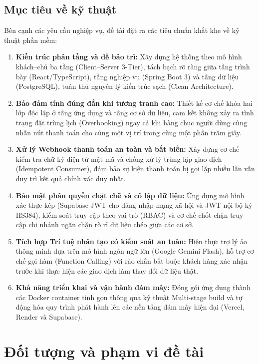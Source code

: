 \subsection{Mục tiêu về kỹ thuật}
Bên cạnh các yêu cầu nghiệp vụ, đề tài đặt ra các tiêu chuẩn khắt khe về kỹ thuật phần mềm:
\begin{enumerate}
    \item \textbf{Kiến trúc phân tầng và dễ bảo trì:} Xây dựng hệ thống theo mô hình khách--chủ ba tầng (Client--Server 3-Tier), tách bạch rõ ràng giữa tầng trình bày (React/TypeScript), tầng nghiệp vụ (Spring Boot 3) và tầng dữ liệu (PostgreSQL), tuân thủ nguyên lý kiến trúc sạch (Clean Architecture).
    \item \textbf{Bảo đảm tính đúng đắn khi tương tranh cao:} Thiết kế cơ chế khóa hai lớp độc lập ở tầng ứng dụng và tầng cơ sở dữ liệu, cam kết không xảy ra tình trạng đặt trùng lịch (Overbooking) ngay cả khi hàng chục người dùng cùng nhấn nút thanh toán cho cùng một vị trí trong cùng một phần trăm giây.
    \item \textbf{Xử lý Webhook thanh toán an toàn và bất biến:} Xây dựng cơ chế kiểm tra chữ ký điện tử mật mã và chống xử lý trùng lặp giao dịch (Idempotent Consumer), đảm bảo sự kiện thanh toán bị gọi lặp nhiều lần vẫn duy trì kết quả chính xác duy nhất.
    \item \textbf{Bảo mật phân quyền chặt chẽ và cô lập dữ liệu:} Ứng dụng mô hình xác thực kép (Supabase JWT cho đăng nhập mạng xã hội và JWT nội bộ ký HS384), kiểm soát truy cập theo vai trò (RBAC) và cơ chế chốt chặn truy cập chi nhánh ngăn chặn rò rỉ dữ liệu chéo giữa các cơ sở.
    \item \textbf{Tích hợp Trí tuệ nhân tạo có kiểm soát an toàn:} Hiện thực trợ lý ảo thông minh dựa trên mô hình ngôn ngữ lớn (Google Gemini Flash), hỗ trợ cơ chế gọi hàm (Function Calling) với rào chắn bắt buộc khách hàng xác nhận trước khi thực hiện các giao dịch làm thay đổi dữ liệu thật.
    \item \textbf{Khả năng triển khai và vận hành đám mây:} Đóng gói ứng dụng thành các Docker container tinh gọn thông qua kỹ thuật Multi-stage build và tự động hóa quy trình phát hành lên các nền tảng đám mây hiện đại (Vercel, Render và Supabase).
\end{enumerate}

\section{Đối tượng và phạm vi đề tài}
\label{sec:phamvi}

